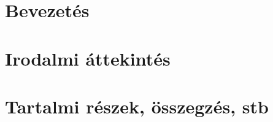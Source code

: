 \documentclass{bce-thesis}
\begin{document}
\maketitle

\begin{abstract}
	Ide kerül a dolgozat rövid kivonata, amennyiben szükséges.
\end{abstract}

\section{Bevezetés}



\cleardoublepage

\section{Irodalmi áttekintés}



\cleardoublepage

\section{Tartalmi részek, összegzés, stb}



\cleardoublepage


\printbibliography[title=Irodalomjegyzék]

\listoffigures

\cleardoublepage

\nyilatkozat
\end{document}
